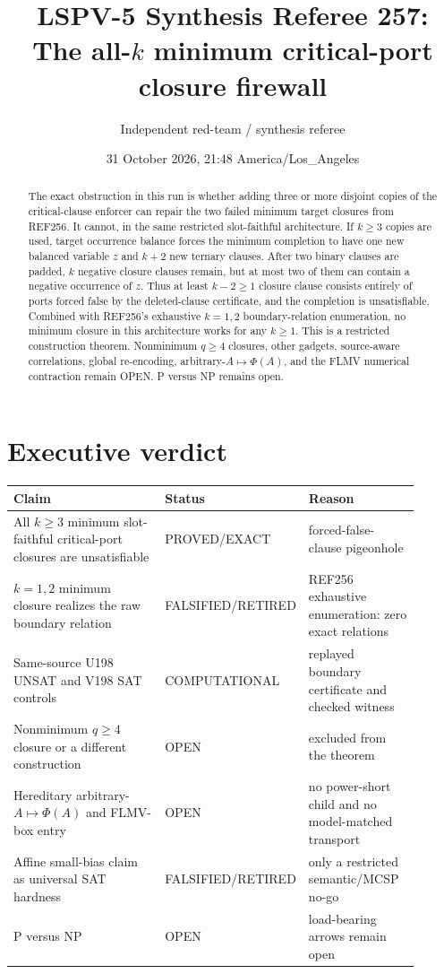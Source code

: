\documentclass[11pt]{article}
\title{LSPV-5 Synthesis Referee 257:\\The all-$k$ minimum critical-port closure firewall}
\author{Independent red-team / synthesis referee}
\date{31 October 2026, 21:48 America/Los\_Angeles}
\newcommand{\status}[1]{\textsf{#1}}
\begin{document}
\maketitle

\begin{abstract}
The exact obstruction in this run is whether adding three or more disjoint copies of the critical-clause enforcer can repair the two failed minimum target closures from REF256.  It cannot, in the same restricted slot-faithful architecture.  If $k\geq3$ copies are used, target occurrence balance forces the minimum completion to have one new balanced variable $z$ and $k+2$ new ternary clauses.  After two binary clauses are padded, $k$ negative closure clauses remain, but at most two of them can contain a negative occurrence of $z$.  Thus at least $k-2\geq1$ closure clause consists entirely of ports forced false by the deleted-clause certificate, and the completion is unsatisfiable.  Combined with REF256's exhaustive $k=1,2$ boundary-relation enumeration, no minimum closure in this architecture works for any $k\geq1$.  This is a restricted construction theorem.  Nonminimum $q\geq4$ closures, other gadgets, source-aware correlations, global re-encoding, arbitrary-$A\mapsto\Phi(A)$, and the FLMV numerical contraction remain \status{OPEN}.  P versus NP remains open.
\end{abstract}

\section{Executive verdict}

\begin{center}
\begin{tabular}{p{0.43\linewidth}p{0.19\linewidth}p{0.28\linewidth}}
\toprule
Claim & Status & Reason \\
\midrule
All $k\geq3$ minimum slot-faithful critical-port closures are unsatisfiable & \status{PROVED/EXACT} & forced-false-clause pigeonhole \\
$k=1,2$ minimum closure realizes the raw boundary relation & \status{FALSIFIED/RETIRED} & REF256 exhaustive enumeration: zero exact relations \\
Same-source U198 UNSAT and V198 SAT controls & \status{COMPUTATIONAL} & replayed boundary certificate and checked witness \\
Nonminimum $q\geq4$ closure or a different construction & \status{OPEN} & excluded from the theorem \\
Hereditary arbitrary-$A\mapsto\Phi(A)$ and FLMV-box entry & \status{OPEN} & no power-short child and no model-matched transport \\
Affine small-bias claim as universal SAT hardness & \status{FALSIFIED/RETIRED} & only a restricted semantic/MCSP no-go \\
P versus NP & \status{OPEN} & load-bearing arrows remain open \\
\bottomrule
\end{tabular}
\end{center}
\end{document}
